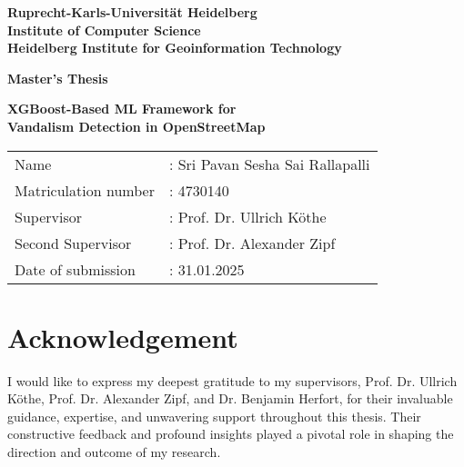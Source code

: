\documentclass[
    13pt, %
    a4paper, %
    listof=totoc, %
    bibliography=totoc, %
    index=totoc, %
    headsepline
]{scrreprt}
\begin{document}
\begin{titlepage}

\begin{center}


\vspace*{2cm} %
\textbf{
\LARGE Ruprecht-Karls-Universität Heidelberg\\
\vspace*{0.5cm}
\smallskip
\Large Institute of Computer Science\\
\smallskip
\Large Heidelberg Institute for Geoinformation Technology\\
}

\vspace{2cm} %
\textbf{\large Master's Thesis} %

\textbf{\LARGE
XGBoost-Based ML Framework for \\
\vspace{0.3cm}
Vandalism Detection in OpenStreetMap
}

\vspace{2cm} %
{\large
\begin{tabular}{ll}
Name &:     Sri Pavan Sesha Sai Rallapalli\\
Matriculation number&: 4730140\\
Supervisor&:  Prof. Dr. Ullrich Köthe\\
Second Supervisor&: Prof. Dr. Alexander Zipf\\
Date of submission&:  31.01.2025
\end{tabular}
}

\end{center}

\end{titlepage}




\newpage
\thispagestyle{empty}
\null
\addtocounter{page}{-1}
\clearpage

\newpage
\section*{\LARGE Acknowledgement}
\thispagestyle{plain}

I would like to express my deepest gratitude to my supervisors, Prof. Dr. Ullrich Köthe, Prof. Dr. Alexander Zipf, and Dr. Benjamin Herfort, for their invaluable guidance, expertise, and unwavering support throughout this thesis. Their constructive feedback and profound insights played a pivotal role in shaping the direction and outcome of my research.
\end{document}
